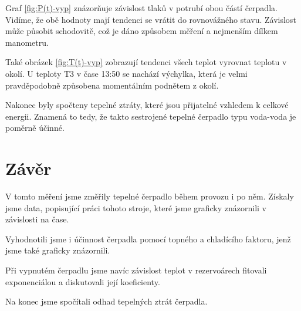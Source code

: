 Graf \ref{fig:P(t)-vyp} znázorňuje závislost tlaků v potrubí obou částí čerpadla. Vidíme, že obě hodnoty mají tendenci se vrátit do rovnovážného stavu. Závislost může působit schodovitě, což je dáno způsobem měření a nejmenším dílkem manometru.

Také obrázek \ref{fig:T(t)-vyp} zobrazují tendenci všech teplot vyrovnat teplotu v okolí. U teploty T3 v čase 13:50 se nachází výchylka, která je velmi pravděpodobně způsobena momentálním podnětem z okolí.

Nakonec byly spočteny tepelné ztráty, které jsou přijatelné vzhledem k celkové energii. Znamená to tedy, že takto sestrojené tepelné čerpadlo typu voda-voda je poměrně účinné.

\section{Závěr}

V tomto měření jsme změřily tepelné čerpadlo během provozu i po něm. Získaly jsme data, popisující práci tohoto stroje, které jsme graficky znázornili v závislosti na čase.

Vyhodnotili jsme i účinnost čerpadla pomocí topného a chladícího faktoru, jenž jsme také graficky znázornili.

Při vypnutém čerpadlu jsme navíc závislost teplot v rezervoárech fitovali exponenciálou a diskutovali její koeficienty.

Na konec jsme spočítali odhad tepelných ztrát čerpadla.